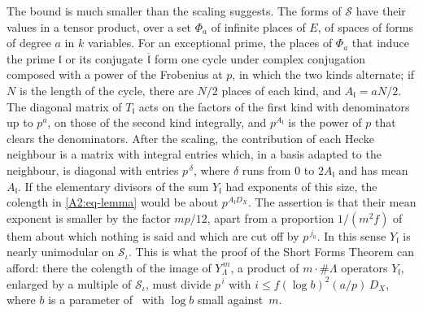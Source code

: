 \documentclass[10pt]{amsart}
\theoremstyle{definition}
\theoremstyle{remark}
\providecommand{\auDX}{D_X}
\providecommand{\auPa}{\Phi_a}
\providecommand{\auS}{\mathcal S}
\providecommand{\aubar}[1]{\overline{#1}}
\begin{document}
The bound is much smaller than the scaling suggests. The forms of $\auS$ have their values in a
tensor product, over a set $\auPa$ of infinite places of $E$, of spaces of forms of degree $a$ in
$k$ variables. For an exceptional prime, the places of $\auPa$ that induce the prime $\mathfrak l$
or its conjugate $\aubar{\mathfrak l}$ form one cycle under complex conjugation composed with a
power of the Frobenius at $p$, in which the two kinds alternate; if $N$ is the length of the
cycle, there are $N/2$ places of each kind, and $A_{\mathfrak l}=aN/2$. The diagonal matrix of $T_{\mathfrak l}$ acts
on the factors of the first kind with denominators up to $p^a$, on those of the second kind
integrally, and $p^{A_{\mathfrak l}}$ is the power of $p$ that clears the denominators. After the
scaling, the contribution of each Hecke neighbour is a matrix with integral entries which, in a
basis adapted to the neighbour, is diagonal with entries $p^{\,\delta}$, where $\delta$ runs from
$0$ to $2A_{\mathfrak l}$ and has mean $A_{\mathfrak l}$. If the elementary divisors of the sum
$Y_{\mathfrak l}$ had exponents of this size, the colength in \eqref{A2:eq-lemma} would be about
$p^{A_{\mathfrak l}\auDX}$. The assertion is that their mean exponent is smaller by the factor
$mp/12$, apart from a proportion $1/(m^2f)$ of them about which nothing is said and which are cut
off by $p^{\,j_0}$. In this sense $Y_{\mathfrak l}$ is nearly unimodular on $\auS_\iota$. This is
what the proof of the Short Forms Theorem can afford: there the colength of the image of
$Y_\Lambda^{\,m}$, a product of $m\cdot\#\Lambda$ operators $Y_{\mathfrak l}$, enlarged by a
multiple of $\auS_\iota$, must divide $p^{\,i}$ with $i\le f(\log b)^2(a/p)\,\auDX$, where $b$ is
a parameter of~\cite{P46} with $\log b$ small against~$m$.
\end{document}
